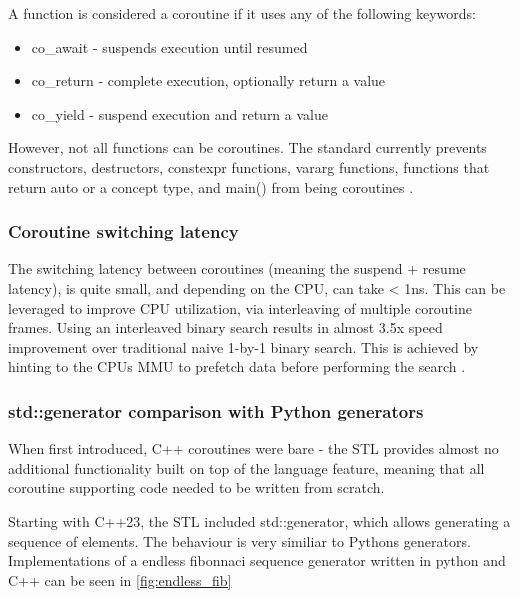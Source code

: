 \documentclass[
    english, %
]{VUMIFPSkursinis}
\begin{document}
A function is considered a coroutine if it uses any of the following keywords:
\begin{itemize}
    \item co\_await - suspends execution until resumed
    \item co\_return - complete execution, optionally return a value
    \item co\_yield - suspend execution and return a value
\end{itemize}

However, not all functions can be coroutines. The standard currently prevents constructors, destructors, constexpr functions, vararg functions, functions that return auto or a concept type, and main() from being coroutines \cite{CookCPP}.


\FloatBarrier
\subsubsection{Coroutine switching latency}

The switching latency between coroutines (meaning the suspend + resume latency), is quite small, and depending on the CPU, can take < 1ns. This can be leveraged to improve CPU utilization, via interleaving of multiple coroutine frames. Using an interleaved binary search results in almost 3.5x speed improvement over traditional naive 1-by-1 binary search. This is achieved by hinting to the CPUs MMU to prefetch data before performing the search \cite{Nanocoro}.

\FloatBarrier
\subsubsection{std::generator comparison with Python generators}

When first introduced, C++ coroutines were bare - the STL provides almost no additional
functionality built on top of the language feature, meaning that all coroutine supporting code
needed to be written from scratch.

Starting with C++23, the STL included std::generator,
which allows generating a sequence of elements. The behaviour is very similiar to
Pythons generators. Implementations of a endless fibonnaci sequence generator written in python and C++ can
be seen in \cref{fig:endless_fib}
\end{document}
